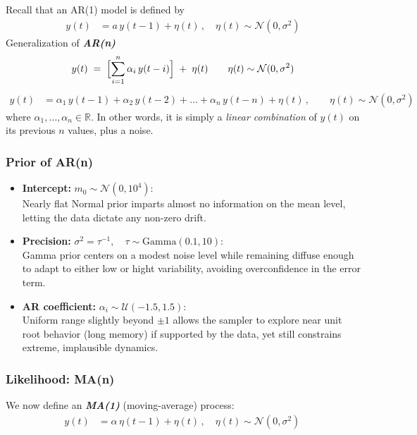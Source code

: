 \documentclass{Configuration_Files/PoliMi3i_thesis}
\begin{document}
Recall that an AR(1) model is defined by
\begin{align}
y(t) &= a\,y(t-1) + \eta(t)\,, 
\quad \eta(t)\sim\mathcal{N}(0,\sigma^2)
\end{align}
Generalization of \textbf{\textit{AR(n)}}
\[
y(t) \;=\; \Bigl[\sum_{i=1}^{n}\alpha_i\,y(t-i)\Bigr]\;+\;\eta(t)
\qquad
\eta(t)\sim\mathcal{N}(0,\sigma^2)
\]
\begin{align}
y(t)
&=
\alpha_{1}\,y(t-1)
+ \alpha_{2}\,y(t-2)
+ \dots
+ \alpha_{n}\,y(t-n)
+ \eta(t)\,, 
\qquad
\eta(t)\sim\mathcal{N}(0,\sigma^2)
\end{align}
where $\alpha_{1},\dots,\alpha_{n}\in\mathbb{R}$.  In other words, it is simply a \emph{linear combination} of \(y(t)\) on its previous $n$ values, plus a noise.

\subsubsection{Prior of AR(n)}
\begin{itemize}
    \item \textbf{Intercept:} $m_0 \sim \mathcal{N}(0,10^4)$:\\
    Nearly flat Normal prior imparts almost no information on the mean level, letting the data dictate any non-zero drift.
    \item \textbf{Precision:} $\sigma^2 = \tau^{-1}, \quad \tau \sim \mathrm{Gamma}(0.1, 10)$:\\
    Gamma prior centers on a modest noise level while remaining diffuse enough to adapt to either low or hight variability, avoiding overconfidence in the error term. 
    \item \textbf{AR coefficient:} $\alpha_i \sim \mathcal{U}(-1.5,1.5)$:\\
    Uniform range slightly beyond $\pm 1$ allows the sampler to explore near unit root behavior (long memory) if supported by the data, yet still constrains extreme, implausible dynamics.
\end{itemize}


\subsubsection{Likelihood: MA(n)} 
We now define an \textbf{\textit{MA(1)}} (moving-average) process:
\begin{align}
y(t) &= \alpha\,\eta(t-1) + \eta(t)\,, 
\quad \eta(t)\sim\mathcal{N}(0,\sigma^2)\,
\end{align}
  
\end{document}
